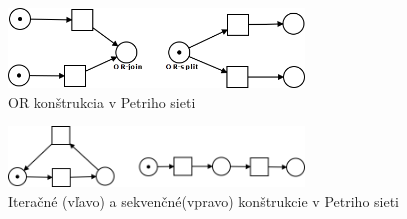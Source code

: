 \begin{figure}[h]
	\centerline{\includegraphics[width=0.7\textwidth]{images/or}}
	\caption[or]{OR konštrukcia v Petriho sieti}
	\label{obr:cursus}
\end{figure}

\begin{figure}[h]
	\centerline{\includegraphics[width=0.7\textwidth]{images/iteracia}}
	\caption[sekvencne a iteračné]{Iteračné (vľavo) a sekvenčné(vpravo) konštrukcie v Petriho sieti}
	\label{obr:cursus}
\end{figure}



